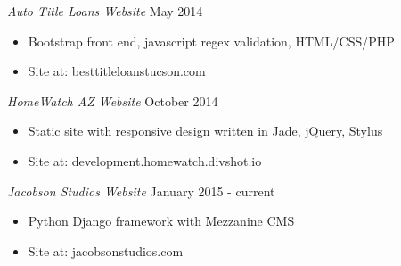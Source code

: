 \documentclass[margin]{res}
\begin{document}
\begin{resume}
  {\sl Auto Title Loans Website} \hfill May 2014 \\
  \begin{itemize}
      \item Bootstrap front end, javascript regex validation, HTML/CSS/PHP
      \item Site at: besttitleloanstucson.com
  \end{itemize} 

  {\sl HomeWatch AZ Website} \hfill October 2014 \\
  \begin{itemize}
      \item Static site with responsive design written in Jade, jQuery, Stylus
      \item Site at: development.homewatch.divshot.io
  \end{itemize} 

  {\sl Jacobson Studios Website} \hfill January 2015 - current \\
  \begin{itemize}
      \item Python Django framework with Mezzanine CMS
      \item Site at: jacobsonstudios.com
  \end{itemize} 



\end{resume}
\end{document}
